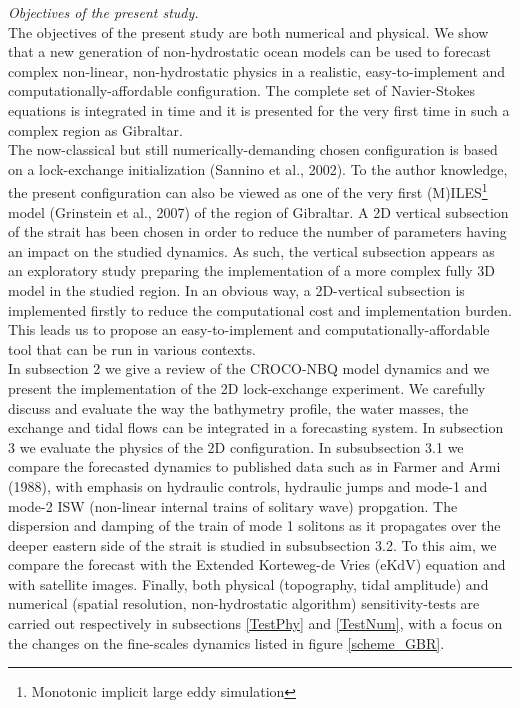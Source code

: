 \textit{Objectives of the present study.}\\
The objectives of the present study are both numerical and physical. We show that a new generation of non-hydrostatic ocean models can be used to forecast complex non-linear, non-hydrostatic physics in a realistic, easy-to-implement and computationally-affordable configuration. The complete set of Navier-Stokes equations is integrated in time and it is presented for the very first time in such a complex region as Gibraltar.\\
The now-classical but still numerically-demanding chosen configuration is based on a lock-exchange initialization (Sannino et al., 2002). To the author knowledge, the present configuration can also be viewed as one of the very first (M)ILES\footnote{Monotonic implicit large eddy simulation \color{black}} model (Grinstein et al., 2007) of the region of Gibraltar. 
A 2D vertical subsection of the strait has been chosen in order to reduce the number of parameters having an impact on the studied dynamics. As such, the vertical subsection appears as an exploratory study preparing the implementation of a more complex fully 3D model in the studied region. In an obvious way, a 2D-vertical subsection is implemented firstly to reduce the computational cost and implementation burden. This leads us to propose an easy-to-implement and computationally-affordable tool that can be run in various contexts.\\


In subsection 2 we give a review of the CROCO-NBQ model dynamics and we present the implementation of the 2D lock-exchange experiment. We carefully discuss and evaluate the way the bathymetry profile, the water masses, the exchange and tidal flows can be integrated in a forecasting system. In subsection 3 we evaluate the physics of the 2D configuration. In subsubsection 3.1 we compare the forecasted dynamics to published data such as in Farmer and Armi (1988), with emphasis on hydraulic controls, hydraulic jumps and mode-1 and mode-2 ISW (non-linear internal trains of solitary wave) propgation. The dispersion and damping of the train of mode 1 solitons as it propagates over the deeper eastern side of the strait is studied in subsubsection 3.2. To this aim, we compare the forecast with the Extended Korteweg-de Vries (eKdV) equation and with satellite images. Finally, both physical (topography, tidal amplitude) and numerical (spatial resolution, non-hydrostatic algorithm) sensitivity-tests are carried out respectively in subsections \ref{TestPhy} and \ref{TestNum}, with a focus on the changes on the fine-scales dynamics listed in figure \ref{scheme_GBR}.

